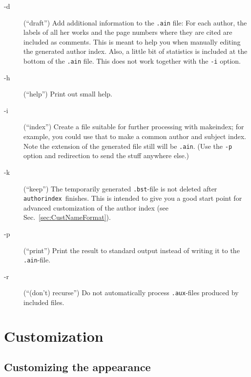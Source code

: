\documentclass{article}
\newcommand{\mkindex}{\textsf{makeindex}}
\newcommand{\aiperl}{\texttt{authorindex}}
\newcommand{\fnext}[1]{\texttt{.#1}}
\newcommand{\option}[1]{\texttt{#1}}
\begin{document}
\begin{description}
\item[-d] (``draft'') Add additional information to the \fnext{ain} file: For
  each author, the labels of all her works and the page numbers where they
  are cited are included as comments. This is meant to help you when manually
  editing the generated author index. Also, a little bit of statistics is
  included at the bottom of the \fnext{ain} file. This does not work together
  with the \option{-i} option.
\item[-h] (``help'') Print out small help.
\item[-i] (``index'') Create a file suitable for further processing with
  \mkindex; for example, you could use that to make a common author and
  subject index. Note the extension of the generated file still will be
  \fnext{ain}.  (Use the \option{-p} option and redirection to send the stuff
  anywhere else.)
\item[-k] (``keep'') The temporarily generated \fnext{bst}-file is not
  deleted after \aiperl\ finishes. This is intended to give you a good start
  point for advanced customization of the author index (see
  Sec.~\ref{sec:CustNameFormat}).
\item[-p] (``print'') Print the result to standard output instead of writing it
  to the \fnext{ain}-file.
\item[-r] (``(don't) recurse'') Do not automatically process
  \fnext{aux}-files produced by included files.
\end{description}


\section{Customization}

\subsection{Customizing the appearance}
\label{sec:CustAppear}
\end{document}
